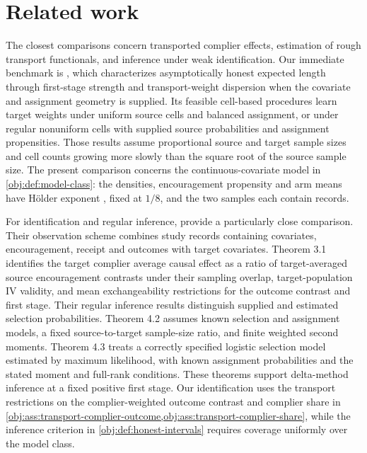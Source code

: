 \documentclass[11pt]{article}
\begin{document}
\section{Related work}
\label{sec:related-work}

The closest comparisons concern transported complier effects, estimation of rough transport functionals, and inference under weak identification. Our immediate benchmark is \citet{CausalSmith2026TransportedLATEStrengthFrontier}, which characterizes asymptotically honest expected length through first-stage strength and transport-weight dispersion when the covariate and assignment geometry is supplied. Its feasible cell-based procedures learn target weights under uniform source cells and balanced assignment, or under regular nonuniform cells with supplied source probabilities and assignment propensities. Those results assume proportional source and target sample sizes and cell counts growing more slowly than the square root of the source sample size. The present comparison concerns the continuous-covariate model in \cref{obj:def:model-class}: the densities, encouragement propensity and arm means have Hölder exponent , fixed at \(1/8\), and the two samples each contain  records.

For identification and regular inference, \citet[Theorems 3.1, 4.2 and 4.3]{ChenHuang2025Generalizing} provide a particularly close comparison. Their observation scheme combines study records containing covariates, encouragement, receipt and outcomes with target covariates. Theorem 3.1 identifies the target complier average causal effect as a ratio of target-averaged source encouragement contrasts under their sampling overlap, target-population IV validity, and mean exchangeability restrictions for the outcome contrast and first stage. Their regular inference results distinguish supplied and estimated selection probabilities. Theorem 4.2 assumes known selection and assignment models, a fixed source-to-target sample-size ratio, and finite weighted second moments. Theorem 4.3 treats a correctly specified logistic selection model estimated by maximum likelihood, with known assignment probabilities and the stated moment and full-rank conditions. These theorems support delta-method inference at a fixed positive first stage. Our identification uses the transport restrictions on the complier-weighted outcome contrast and complier share in \cref{obj:ass:transport-complier-outcome,obj:ass:transport-complier-share}, while the inference criterion in \cref{obj:def:honest-intervals} requires coverage uniformly over the model class.
\end{document}
